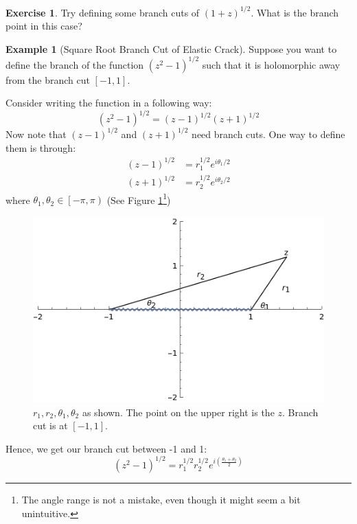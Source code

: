 \documentclass[a4paper, 12pt]{article}
\theoremstyle{definition}
\newtheorem{exercise}{Exercise}
\newtheorem{example}{Example}
\numberwithin{theorem}{section}
\numberwithin{definition}{section}
\numberwithin{exercise}{section}
\numberwithin{remark}{section}
\numberwithin{figure}{section}
\numberwithin{example}{section}
\begin{document}
\begin{exercise}
    Try defining some branch cuts of $\left( 1+z \right)^{1/2}$.
    What is the branch point in this case?
\end{exercise}
\begin{example}[Square Root Branch Cut of Elastic Crack]
    \label{eg: Square Root Branch Cut of Elastic Crack}
    Suppose you want to define the branch of the function $\left( z^2 - 1 \right)^{1/2}$
    such that it is holomorphic away from the branch cut $\left[ -1,1 \right]$.

    Consider writing the function in a following way:
    \begin{equation*}
        \left( z^2 - 1 \right)^{1/2} = \left( z-1 \right)^{1/2} \left( z+1 \right)^{1/2}
    \end{equation*}
    Now note that $\left( z-1 \right)^{1/2}$ and $\left( z+1 \right)^{1/2}$ need branch cuts.
    One way to define them is through:
    \begin{align*}
        \left( z-1 \right)^{1/2} &= r_1^{1/2} e^{i\theta_1 / 2} \\
        \left( z+1 \right)^{1/2} &= r_2^{1/2} e^{i\theta_2 / 2}
    \end{align*}
    where $\theta_1, \theta_2 \in \left[ -\pi, \pi \right)$ (See Figure \ref{fig: Crack Tip 2}\footnote{
            The angle range is not a mistake, even though it might seem a bit unintuitive.
    })
    \begin{figure}[tbp]
        \centering
        \includegraphics{crackTip2}
        \caption{$r_1, r_2, \theta_1, \theta_2$ as shown. The point on the upper right is the $z$. Branch cut is at $[-1,1]$.}
        \label{fig: Crack Tip 2}
    \end{figure}
    Hence, we get our branch cut between -1 and 1:
    \begin{equation*}
        \left( z^2 - 1 \right)^{1/2} = r_1^{1/2} r_2^{1/2} e^{i \left( \frac{\theta_1 + \theta_2}{2} \right)}
    \end{equation*}
\end{example}
\end{document}
